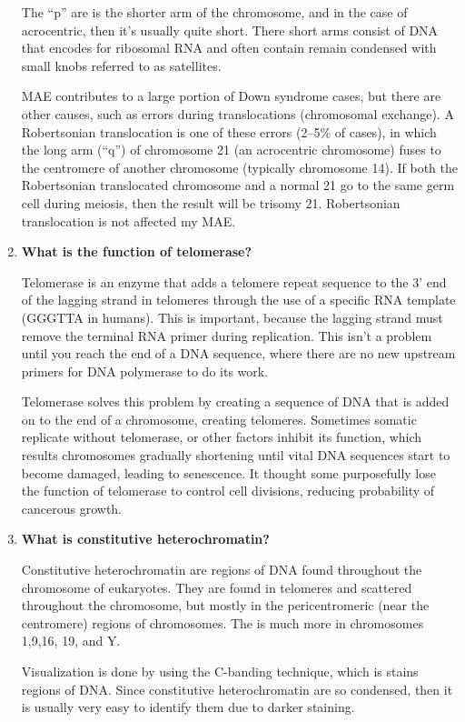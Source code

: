 \documentclass[basic]{inVerba-notes}
\begin{document}
\begin{enumerate}
    The ``p'' are is the shorter arm of the chromosome, and in the case of acrocentric, then it's usually quite short. There short arms consist of DNA that encodes for ribosomal RNA and often contain remain condensed with small knobs referred to as satellites.

    MAE contributes to a large portion of Down syndrome cases, but there are other causes, such as errors during translocations (chromosomal exchange). A Robertsonian translocation is one of these errors (2--5\% of cases), in which the long arm (``q'') of chromosome 21 (an acrocentric chromosome) fuses to the centromere of another chromosome (typically chromosome 14). If both the Robertsonian translocated chromosome and a normal 21 go to the same germ cell during meiosis, then the result will be trisomy 21. Robertsonian translocation is not affected my MAE\@.

    \item \textbf{What is the function of telomerase?}
    
    Telomerase is an enzyme that adds a telomere repeat sequence to the 3' end of the lagging  strand in telomeres through the use of a specific RNA template (GGGTTA in humans). This is important, because the lagging strand must remove the terminal RNA primer during replication. This isn't a problem until you reach the end of a DNA sequence, where there are no new upstream primers for DNA polymerase to do its work.

    Telomerase solves this problem by creating a sequence of DNA that is added on to the end of a chromosome, creating telomeres. Sometimes somatic replicate without telomerase, or other factors inhibit its function, which results chromosomes gradually shortening until vital DNA sequences start to become damaged, leading to senescence. It thought some purposefully lose the function of telomerase to control cell divisions, reducing probability of cancerous growth.  

    \item \textbf{What is constitutive heterochromatin?}

    Constitutive heterochromatin are regions of DNA found throughout the chromosome of eukaryotes. They are found in telomeres and scattered throughout the chromosome, but mostly in the pericentromeric (near the centromere) regions of chromosomes. The is much more in chromosomes 1,9,16, 19, and Y. 

    Visualization is done by using the C-banding technique, which is stains regions of DNA\@. Since constitutive heterochromatin are so condensed, then it is usually very easy to identify them due to darker staining.


\end{enumerate}
\end{document}

